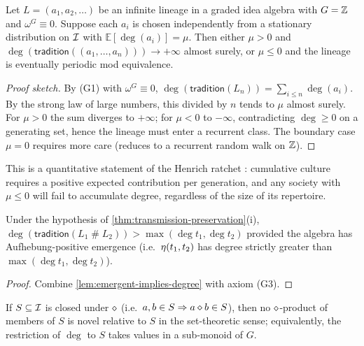 \begin{theorem}
\label{thm:zero-one}
Let $L = (a_1, a_2, \dots)$ be an infinite lineage in a graded idea
algebra with $G = \mathbb{Z}$ and $\omega^G \equiv 0$. Suppose each $a_i$ is
chosen independently from a stationary distribution on $\mathcal{I}$ with
$\mathbb{E}[\deg(a_i)] = \mu$. Then either $\mu > 0$ and
$\deg(\mathsf{tradition}((a_1,\dots,a_n))) \to +\infty$ almost surely,
or $\mu \le 0$ and the lineage is eventually periodic mod equivalence.
\end{theorem}

\begin{proof}[Proof sketch]
By (G1) with $\omega^G \equiv 0$, $\deg(\mathsf{tradition}(L_n)) =
\sum_{i\le n}\deg(a_i)$. By the strong law of large numbers, this
divided by $n$ tends to $\mu$ almost surely. For $\mu > 0$ the sum
diverges to $+\infty$; for $\mu < 0$ to $-\infty$, contradicting
$\deg \ge 0$ on a generating set, hence the lineage must enter a
recurrent class. The boundary case $\mu = 0$ requires more care
(reduces to a recurrent random walk on $\mathbb{Z}$).
\end{proof}

This is a quantitative statement of the Henrich ratchet
\cite{Henrich2015}: cumulative culture requires a positive expected
contribution per generation, and any society with $\mu \le 0$ will
fail to accumulate degree, regardless of the size of its repertoire.

\begin{corollary}
\label{cor:composite-emergence}
Under the hypothesis of
\cref{thm:transmission-preservation}(i),
$\deg(\mathsf{tradition}(L_1\mathbin{\#}L_2)) > \max(\deg t_1,\deg t_2)$
provided the algebra has Aufhebung-positive emergence (i.e.\
$\eta(t_1,t_2)$ has degree strictly greater than
$\max(\deg t_1,\deg t_2)$).
\end{corollary}

\begin{proof}
Combine \cref{lem:emergent-implies-degree} with axiom (G3).
\end{proof}

\begin{corollary}
\label{cor:closed-no-emergence}
If $S\subseteq \mathcal{I}$ is closed under $\mathbin{\diamond}$ (i.e.\ $a,b\in S
\Rightarrow a\mathbin{\diamond} b \in S$), then no $\mathbin{\diamond}$-product of members
of $S$ is novel relative to $S$ in the set-theoretic sense; equivalently,
the restriction of $\deg$ to $S$ takes values in a sub-monoid of $G$.
\end{corollary}

